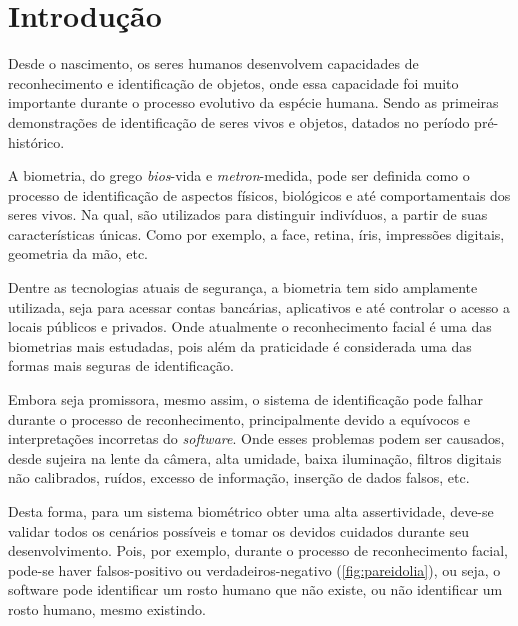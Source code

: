 
\chapter{Introdução}\label{cap:introducao}

Desde o nascimento, os seres humanos desenvolvem capacidades de reconhecimento e 
identificação de objetos, onde essa capacidade foi muito 
importante durante o processo evolutivo da espécie humana. Sendo as primeiras 
demonstrações de identificação de seres vivos e objetos, datados no período 
pré-histórico.

A biometria, do grego \textit{bios}-vida e \textit{metron}-medida, pode ser 
definida como o processo de identificação de aspectos físicos, biológicos e até 
comportamentais dos seres vivos. Na qual, são utilizados para distinguir indivíduos, 
a partir de suas características únicas. Como por exemplo, a face, retina, 
íris, impressões digitais, geometria da mão, etc.

Dentre as tecnologias atuais de segurança, a biometria tem sido amplamente 
utilizada, seja para acessar contas bancárias, aplicativos e até controlar 
o acesso a locais públicos e privados. Onde atualmente o reconhecimento facial 
é uma das biometrias mais estudadas, pois além da praticidade é considerada uma 
das formas mais seguras de identificação. 

Embora seja promissora, mesmo assim, o sistema de identificação pode falhar durante o 
processo de reconhecimento, principalmente devido a equívocos e interpretações 
incorretas do \textit{software}. Onde esses problemas podem ser causados,
desde sujeira na lente da câmera, alta umidade, baixa iluminação, filtros digitais 
não calibrados, ruídos, excesso de informação, inserção de dados falsos, etc.

Desta forma, para um sistema biométrico obter uma alta assertividade, 
deve-se validar todos os cenários possíveis e tomar os devidos cuidados durante seu 
desenvolvimento. Pois, por exemplo, durante o processo de reconhecimento facial,
pode-se haver falsos-positivo ou verdadeiros-negativo (\autoref{fig:pareidolia}), ou seja, o software pode identificar 
um rosto humano que não existe, ou não identificar um rosto humano, mesmo existindo.

